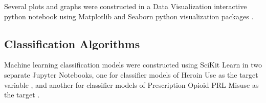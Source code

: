 \documentclass[sigconf]{acmart}
\begin{document}
Several plots and graphs were constructed in a Data Visualization interactive
python notebook \cite{dataviz17} using Matplotlib and Seaborn python 
visualization packages \cite{mckinney17, vanderplas17}.  

\subsection{Classification Algorithms}
Machine learning classification models were constructed using SciKit Learn 
\cite{muller17, raschka17} in two separate Jupyter Notebooks, one for 
classifier models of Heroin Use as the target variable \cite{classifyH}, and 
another for classifier models of Prescription Opioid PRL Misuse as the target 
\cite{classifyPRL}. 


%
\end{document}
